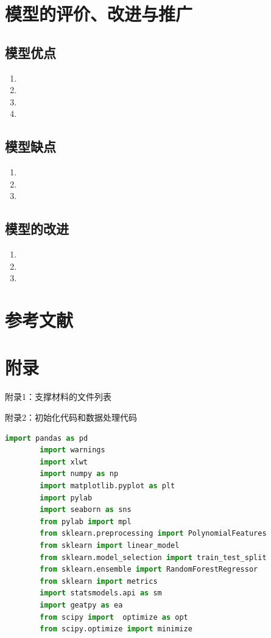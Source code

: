 \documentclass[a4paper]{article}
\begin{document}
	
	
	\section{模型的评价、改进与推广}
	\subsection{模型优点}
	\begin{enumerate}
		\item 
		\item 
		\item 
		\item 
	\end{enumerate}
	
	\subsection{模型缺点}
	\begin{enumerate}
		\item 
		\item 
		\item 
	\end{enumerate}
	
	\subsection{模型的改进}
	\begin{enumerate}
		\item 
		\item 
		\item 
	\end{enumerate}
	
	\section{参考文献}
	\vspace{-2em} %
	\begin{thebibliography}{9}  
	\end{thebibliography}
	
	\newpage
	\section*{附录}
	
	附录1：支撑材料的文件列表
	
	
	附录2：初始化代码和数据处理代码
	\begin{lstlisting}[language=python,columns=fullflexible,frame=shadowbox]
		import pandas as pd
		import warnings
		import xlwt
		import numpy as np
		import matplotlib.pyplot as plt
		import pylab
		import seaborn as sns
		from pylab import mpl
		from sklearn.preprocessing import PolynomialFeatures
		from sklearn import linear_model
		from sklearn.model_selection import train_test_split
		from sklearn.ensemble import RandomForestRegressor
		from sklearn import metrics
		import statsmodels.api as sm
		import geatpy as ea
		from scipy import  optimize as opt
		from scipy.optimize import minimize
	\end{lstlisting}
	
\end{document}
